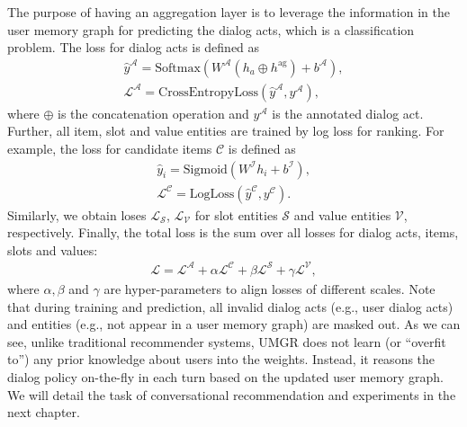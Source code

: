 The purpose of having an aggregation layer is to leverage the information in the user memory graph for predicting the dialog acts, which is a classification problem. The loss for dialog acts is defined as
\begin{equation}
\begin{split}
\hat{y}^{\mathcal{A}} = \text{Softmax}(W^\mathcal{A} (h_a \oplus h^\text{ag}) +b^\mathcal{A} ), \\
\mathcal{L}^{\mathcal{A}} = \text{CrossEntropyLoss}(\hat{y}^\mathcal{A}, y^\mathcal{A}),
\end{split}
\end{equation}
where $\oplus$ is the concatenation operation and $y^\mathcal{A}$ is the annotated dialog act.
Further, all item, slot and value entities are trained by log loss for ranking. For example, the loss for candidate items $\mathcal{C}$ is defined as 
\begin{equation}
\begin{split}
\hat{y}_i = \text{Sigmoid}(W^\mathcal{I} h_i +b^{\mathcal{I}} ), \\
\mathcal{L}^\mathcal{C} = \text{LogLoss}(\hat{y}^\mathcal{C}, y^\mathcal{C}).
\end{split}
\end{equation}
Similarly, we obtain loses $\mathcal{L}_\mathcal{S}$, $\mathcal{L}_\mathcal{V}$ for slot entities $\mathcal{S}$ and value entities $\mathcal{V}$, respectively.
Finally, the total loss is the sum over all losses for dialog acts, items, slots and values: 
\begin{equation}
\begin{split}
\mathcal{L} = \mathcal{L}^\mathcal{A} + \alpha\mathcal{L}^\mathcal{C} + \beta\mathcal{L}^\mathcal{S} + \gamma \mathcal{L}^\mathcal{V},
\end{split}
\end{equation}
where $\alpha, \beta$ and $\gamma$ are hyper-parameters to align losses of different scales.
Note that during training and prediction, all invalid dialog acts (e.g., user dialog acts) and entities (e.g., not appear in a user memory graph) are masked out.
As we can see, unlike traditional recommender systems, UMGR does not learn (or ``overfit to'') any prior knowledge about users into the weights. Instead, it reasons the dialog policy on-the-fly in each turn based on the updated user memory graph.
We will detail the task of conversational recommendation and experiments in the next chapter.
